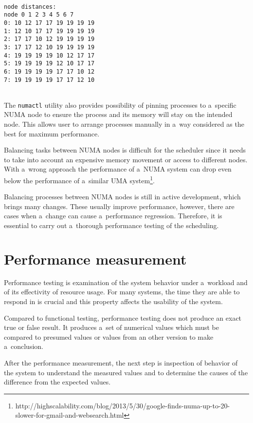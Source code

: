 \begin{minipage}{\linewidth}
\begin{verbatim}

node distances:
node 0 1 2 3 4 5 6 7
0: 10 12 17 17 19 19 19 19
1: 12 10 17 17 19 19 19 19
2: 17 17 10 12 19 19 19 19
3: 17 17 12 10 19 19 19 19
4: 19 19 19 19 10 12 17 17
5: 19 19 19 19 12 10 17 17
6: 19 19 19 19 17 17 10 12
7: 19 19 19 19 17 17 12 10
\end{verbatim}
\end{minipage}\\

The \texttt{numactl} utility also provides possibility of pinning processes to
a~specific NUMA node to ensure the process and its memory will stay on the
intended node. This allows user to arrange processes manually in a~way considered
as the best for maximum performance.

Balancing tasks between NUMA nodes is difficult for the scheduler since it needs
to take into account an expensive memory movement or access to different nodes.
With a~wrong approach the performance of a~NUMA system can drop even below the
performance of a~similar UMA
system\footnote{http://highscalability.com/blog/2013/5/30/google-finds-numa-up-to-20-slower-for-gmail-and-websearch.html}.

Balancing processes between NUMA nodes is still in active development, which
brings many changes. These usually improve performance, however, there are cases
when a~change can cause a~performance regression. Therefore, it is essential to
carry out a~thorough performance testing of the scheduling.



\chapter{Performance measurement} \label{ch:measurement}
Performance testing is examination of the system behavior under a~workload and of its
effectivity of resource usage. For many systems, the time they are able to
respond in is crucial and this property affects the usability of the system.

Compared to functional testing, performance testing does not produce an exact true
or false result. It produces a~set of numerical values which must be compared to
presumed values or values from an other version to make a~conclusion.

After the performance measurement, the next step is inspection of behavior of
the system to understand the measured values and to determine the causes of the
difference from the expected values.

